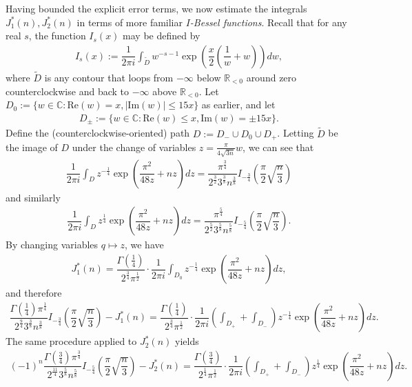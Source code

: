 \documentclass[11pt,reqno]{amsart}
\theoremstyle{definition}
\theoremstyle{plain}
\theoremstyle{named}
\newcommand{\R}{\mathbb{R}}
\newcommand{\C}{\mathbb{C}}
\numberwithin{equation}{section}
\theoremstyle{example}
\def\lp{\left(}
\def\rp{\right)}
\begin{document}
Having bounded the explicit error terms, we now estimate the integrals $J^*_1(n), J_2^*(n)$ in terms of more familiar {\it $I$-Bessel functions}. Recall that for any real $s$, the function $I_s(x)$ may be defined by
\begin{align*}
	I_s(x) := \dfrac{1}{2\pi i} \int_{\tilde D} w^{-s-1} \exp\lp \dfrac{x}{2} \lp \dfrac{1}{w} + w \rp \rp dw,
\end{align*}
where $\tilde D$ is any contour that loops from $-\infty$ below $\R_{<0}$ around zero counterclockwise and back to $-\infty$ above $\R_{<0}$. Let $D_0 := \{ w \in \C : \mathrm{Re}\lp w \rp = x, \left| \mathrm{Im}\lp w \rp \right| \leq 15 x \}$ as earlier, and let
\begin{align*}
	D_{\pm} := \{ w \in \C : \mathrm{Re}\lp w \rp \leq x, \mathrm{Im}\lp w \rp = \pm 15 x \}.
\end{align*}
Define the (counterclockwise-oriented) path $D := D_- \cup D_0 \cup D_+$. Letting $\tilde D$ be the image of $D$ under the change of variables $z = \frac{\pi}{4\sqrt{3n}} w$, we can see that
\begin{align*}
	\dfrac{1}{2\pi i} \int_D z^{-\frac 14} \exp\lp \dfrac{\pi^2}{48z} + nz \rp dz = \dfrac{\pi^{\frac 34}}{2^{\frac 32} 3^{\frac 38} n^{\frac 38}} I_{-\frac 34} \lp \dfrac{\pi}{2} \sqrt{\dfrac{n}{3}} \rp
\end{align*}
and similarly
\begin{align*}
	\dfrac{1}{2\pi i} \int_D z^{\frac 14} \exp\lp \dfrac{\pi^2}{48z} + nz \rp dz = \dfrac{\pi^{\frac 54}}{2^{\frac 52} 3^{\frac 58} n^{\frac 58}} I_{-\frac 54}\lp \dfrac{\pi}{2} \sqrt{\dfrac{n}{3}} \rp.
\end{align*}
By changing variables $q \mapsto z$, we have
\begin{align*}
	J_1^*(n) = \dfrac{\Gamma\lp \frac 14 \rp}{2^{\frac 34} \pi^{\frac 12}} \cdot \dfrac{1}{2\pi i} \int_{D_0} z^{-\frac 14} \exp\lp \dfrac{\pi^2}{48z} + nz \rp dz,
\end{align*}
and therefore
\begin{align*}
	\dfrac{\Gamma\lp \frac 14 \rp \pi^{\frac 14}}{2^{\frac 94} 3^{\frac 38} n^{\frac 38}} I_{-\frac 34} \lp \dfrac{\pi}{2} \sqrt{\dfrac{n}{3}} \rp - J_1^*(n) = \dfrac{\Gamma\lp \frac 14 \rp}{2^{\frac 34} \pi^{\frac 12}} \cdot \dfrac{1}{2\pi i} \lp \int_{D_+} + \int_{D_-} \rp z^{-\frac 14} \exp\lp \dfrac{\pi^2}{48z} + nz \rp dz.
\end{align*}
The same procedure applied to $J_2^*(n)$ yields
\begin{align*}
	(-1)^n \dfrac{\Gamma\lp \frac 34 \rp \pi^{\frac 34}}{2^{\frac{11}{4}} 3^{\frac 58} n^{\frac 58}} I_{-\frac 54}\lp \dfrac{\pi}{2} \sqrt{\dfrac{n}{3}} \rp - J_2^*(n) = \dfrac{\Gamma\lp \frac 34 \rp}{2^{\frac 14} \pi^{\frac 12}} \cdot \dfrac{1}{2\pi i} \lp \int_{D_+} + \int_{D_-} \rp z^{\frac 14} \exp\lp \dfrac{\pi^2}{48z} + nz \rp dz.
\end{align*}
\end{document}
